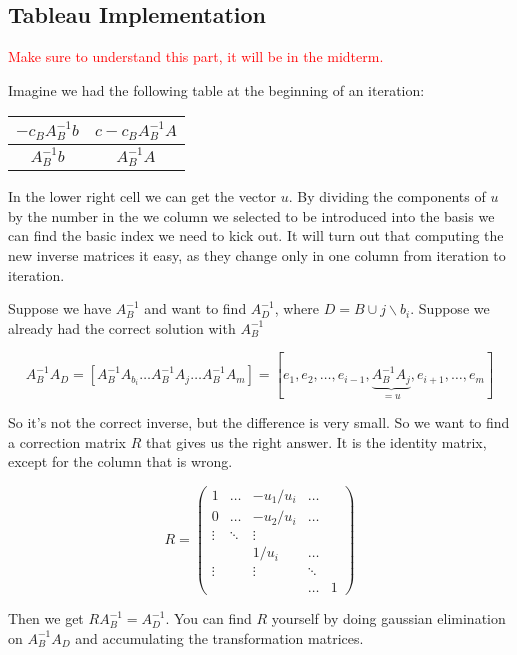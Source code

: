 \subsection*{Tableau Implementation}

\textcolor{red}{Make sure to understand this part, it will be in the midterm.}

Imagine we had the following table at the beginning of an iteration:

\begin{center}
\begin{tabular}{c|c}
$-c_BA_B^{-1}b$ & $c-c_BA_B^{-1}A$\\\hline %
$A^{-1}_B b$ & $A_B^{-1}A$
\end{tabular}
\end{center}

In the lower right cell we can get the vector $u$. By dividing the components of $u$ by the number in the we column we selected to be introduced into the basis we can find the basic index we need to kick out. It will turn out that computing the new inverse matrices it easy, as they change only in one column from iteration to iteration.

Suppose we have $A_B^{-1}$ and want to find $A_D^{-1}$, where $D=B\cup j \backslash b_i$. Suppose we already had the correct solution with $A_B^{-1}$ 

\[A_B^{-1}A_D = \left[ A_B^{-1}A_{b_i}\ldots A_B^{-1}A_j\ldots A_B^{-1}A_m\right] = \left[ e_1,e_2, \ldots, e_{i-1}, \underbrace{A_B^{-1}A_j}_{=u}, e_{i+1},\ldots, e_m\right]\]

So it's not the correct inverse, but the difference is very small. So we want to find a correction matrix $R$ that gives us the right answer. It is the identity matrix, except for the column that is wrong.

\[R= \begin{pmatrix} 
1 & \ldots & -u_1/u_i & \ldots \\
0 & \ldots & -u_2/u_i & \ldots \\
\vdots & \ddots & \vdots \\
& & 1/u_i & \ldots\\
\vdots & &\vdots &\ddots\\
& & & \ldots & 1
\end{pmatrix}\]

Then we get $RA_B^{-1} = A_D^{-1}$. You can find $R$ yourself by doing gaussian elimination on $A_B^{-1}A_D$ and accumulating the transformation matrices.

